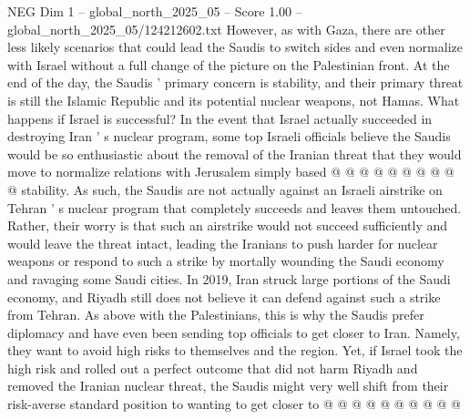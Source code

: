 \begin{textsample}{NEG Dim 1 – global\_north\_2025\_05 – Score 1.00 – global\_north\_2025\_05/124212602.txt}
However, as with Gaza, there are other less likely scenarios that could lead the Saudis to switch sides and even normalize with Israel without a full change of the picture on the Palestinian front.
At the end of the day, the Saudis ' primary concern is stability, and their primary threat is still the Islamic Republic and its potential nuclear weapons, not Hamas.
What happens if Israel is successful?
In the event that Israel actually succeeded in destroying Iran ' s nuclear program, some top Israeli officials believe the Saudis would be so enthusiastic about the removal of the Iranian threat that they would move to normalize relations with Jerusalem simply based @ @ @ @ @ @ @ @ @ @ stability.
As such, the Saudis are not actually against an Israeli airstrike on Tehran ' s nuclear program that completely succeeds and leaves them untouched.
Rather, their worry is that such an airstrike would not succeed sufficiently and would leave the threat intact, leading the Iranians to push harder for nuclear weapons or respond to such a strike by mortally wounding the Saudi economy and ravaging some Saudi cities.
In 2019, Iran struck large portions of the Saudi economy, and Riyadh still does not believe it can defend against such a strike from Tehran.
As above with the Palestinians, this is why the Saudis prefer diplomacy and have even been sending top officials to get closer to Iran.
Namely, they want to avoid high risks to themselves and the region.
Yet, if Israel took the high risk and rolled out a perfect outcome that did not harm Riyadh and removed the Iranian nuclear threat, the Saudis might very well shift from their risk-averse standard position to wanting to get closer to @ @ @ @ @ @ @ @ @ @

\end{textsample}
